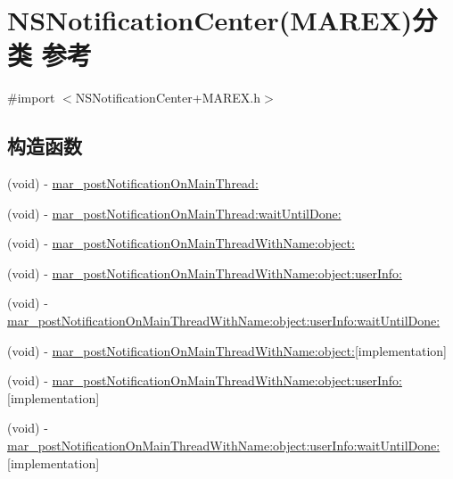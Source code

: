 \hypertarget{category_n_s_notification_center_07_m_a_r_e_x_08}{}\section{N\+S\+Notification\+Center(M\+A\+R\+EX)分类 参考}
\label{category_n_s_notification_center_07_m_a_r_e_x_08}


{\ttfamily \#import $<$N\+S\+Notification\+Center+\+M\+A\+R\+E\+X.\+h$>$}

\subsection*{构造函数}
\begin{DoxyCompactItemize}
\item 
(void) -\/ \hyperlink{category_n_s_notification_center_07_m_a_r_e_x_08_a8af99101dd876b5d2633c7741abee5c0}{mar\+\_\+post\+Notification\+On\+Main\+Thread\+:}
\item 
(void) -\/ \hyperlink{category_n_s_notification_center_07_m_a_r_e_x_08_a21bd5a7944ec24f31ba617331d709c52}{mar\+\_\+post\+Notification\+On\+Main\+Thread\+:wait\+Until\+Done\+:}
\item 
(void) -\/ \hyperlink{category_n_s_notification_center_07_m_a_r_e_x_08_a17fca122dcc906b60d18f9eebaf63484}{mar\+\_\+post\+Notification\+On\+Main\+Thread\+With\+Name\+:object\+:}
\item 
(void) -\/ \hyperlink{category_n_s_notification_center_07_m_a_r_e_x_08_a36d491310d3ef3de31a330b45ee2903f}{mar\+\_\+post\+Notification\+On\+Main\+Thread\+With\+Name\+:object\+:user\+Info\+:}
\item 
(void) -\/ \hyperlink{category_n_s_notification_center_07_m_a_r_e_x_08_a2d895e36e602fa63dba704aede461932}{mar\+\_\+post\+Notification\+On\+Main\+Thread\+With\+Name\+:object\+:user\+Info\+:wait\+Until\+Done\+:}
\item 
(void) -\/ \hyperlink{category_n_s_notification_center_07_m_a_r_e_x_08_aa8fc7f9996f6988090b2eb111aed58c5}{mar\+\_\+post\+Notification\+On\+Main\+Thread\+With\+Name\+:object\+:}{\ttfamily  \mbox{[}implementation\mbox{]}}
\item 
(void) -\/ \hyperlink{category_n_s_notification_center_07_m_a_r_e_x_08_ac6536c8573ec7972f203d35971d06697}{mar\+\_\+post\+Notification\+On\+Main\+Thread\+With\+Name\+:object\+:user\+Info\+:}{\ttfamily  \mbox{[}implementation\mbox{]}}
\item 
(void) -\/ \hyperlink{category_n_s_notification_center_07_m_a_r_e_x_08_a99ce67588c3f1ecfebf228660d62ba5b}{mar\+\_\+post\+Notification\+On\+Main\+Thread\+With\+Name\+:object\+:user\+Info\+:wait\+Until\+Done\+:}{\ttfamily  \mbox{[}implementation\mbox{]}}
\end{DoxyCompactItemize}

